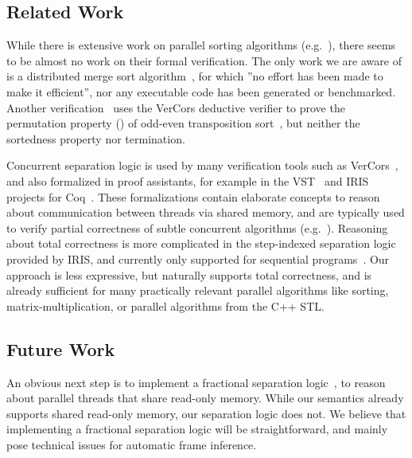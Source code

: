 \documentclass[sn-mathphys,Numbered]{sn-jnl}
\theoremstyle{thmstyleone}%
\theoremstyle{definition}%
\theoremstyle{thmstylethree}%
\begin{document}


    \subsection{Related Work}
    While there is extensive work on parallel sorting algorithms (e.g.~\cite{AWFS22,CNLM08,AMI21}),
    there seems to be almost no work on their formal verification. The only work we are aware of is
    a distributed merge sort algorithm~\cite{HKBK20}, for which ''no effort has been made to make it efficient''\cite[Sec.~2]{HKBK20},
    nor any executable code has been generated or benchmarked. Another verification~\cite{SaHu20} uses
    the VerCors deductive verifier to prove the permutation property ()
    of odd-even transposition sort~\cite{Ha72}, but neither the sortedness property nor termination.

    Concurrent separation logic is used by many verification tools such
    as VerCors~\cite{Vercors}, and also formalized in proof assistants, for example in the VST~\cite{VST}
    and IRIS~\cite{JKJA18} projects for Coq~\cite{BeCa10}. These formalizations contain elaborate concepts to
    reason about communication between threads via shared memory, and are typically used to
    verify partial correctness of subtle concurrent algorithms (e.g.~\cite{MeJo21}).
    Reasoning about total correctness is more complicated in the step-indexed separation logic provided by IRIS,
    and currently only supported for sequential programs~\cite{SGGT21}.
    Our approach is less expressive, but naturally supports total correctness, and is already sufficient for
    many practically relevant parallel algorithms like sorting, matrix-multiplication, or parallel algorithms from
    the C++ STL.



%


    \subsection{Future Work}
      An obvious next step is to implement a fractional separation logic~\cite{BCOP05},
      to reason about parallel threads that share read-only memory. While our semantics
      already supports shared read-only memory, our separation logic does not.
      We believe that implementing a fractional separation logic will be straightforward,
      and mainly pose technical issues for automatic frame inference.
\end{document}
